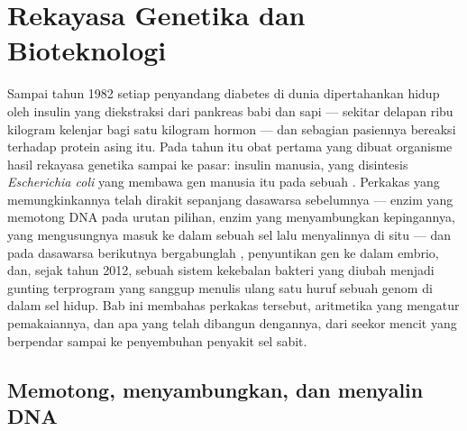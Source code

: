 \chapter{Rekayasa Genetika dan Bioteknologi}\label{ch:b3:genetic-engineering}

Sampai tahun 1982 setiap penyandang diabetes di dunia dipertahankan hidup oleh
insulin yang diekstraksi dari pankreas babi dan sapi --- sekitar delapan ribu
kilogram kelenjar bagi satu kilogram hormon --- dan sebagian pasiennya bereaksi
terhadap protein asing itu. Pada tahun itu obat pertama yang dibuat organisme
hasil rekayasa genetika sampai ke pasar: insulin manusia, yang disintesis
\emph{Escherichia coli} yang membawa gen manusia itu pada sebuah .
Perkakas yang memungkinkannya telah dirakit sepanjang dasawarsa
sebelumnya --- enzim yang memotong DNA pada urutan pilihan, enzim yang
menyambungkan kepingannya,  yang mengusungnya masuk ke dalam sebuah sel
lalu menyalinnya di situ --- dan pada dasawarsa berikutnya bergabunglah
, penyuntikan gen ke dalam embrio, dan, sejak tahun
2012, sebuah sistem kekebalan bakteri yang diubah menjadi gunting terprogram
yang sanggup menulis ulang satu huruf sebuah genom di dalam sel hidup. Bab ini
membahas perkakas tersebut, aritmetika yang mengatur pemakaiannya, dan apa
yang telah dibangun dengannya, dari seekor mencit yang berpendar sampai ke
penyembuhan penyakit sel sabit.

\section{Memotong, menyambungkan, dan menyalin DNA}

